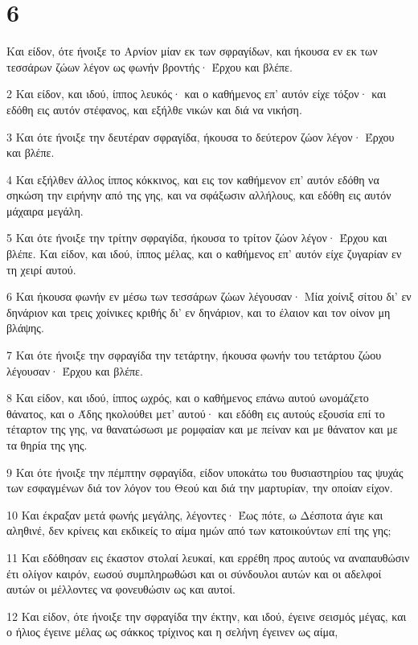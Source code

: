 \chapter{6}

\par Και είδον, ότε ήνοιξε το Αρνίον μίαν εκ των σφραγίδων, και ήκουσα εν εκ των τεσσάρων ζώων λέγον ως φωνήν βροντής· Έρχου και βλέπε.
\par 2 Και είδον, και ιδού, ίππος λευκός· και ο καθήμενος επ' αυτόν είχε τόξον· και εδόθη εις αυτόν στέφανος, και εξήλθε νικών και διά να νικήση.
\par 3 Και ότε ήνοιξε την δευτέραν σφραγίδα, ήκουσα το δεύτερον ζώον λέγον· Έρχου και βλέπε.
\par 4 Και εξήλθεν άλλος ίππος κόκκινος, και εις τον καθήμενον επ' αυτόν εδόθη να σηκώση την ειρήνην από της γης, και να σφάξωσιν αλλήλους, και εδόθη εις αυτόν μάχαιρα μεγάλη.
\par 5 Και ότε ήνοιξε την τρίτην σφραγίδα, ήκουσα το τρίτον ζώον λέγον· Έρχου και βλέπε. Και είδον, και ιδού, ίππος μέλας, και ο καθήμενος επ' αυτόν είχε ζυγαρίαν εν τη χειρί αυτού.
\par 6 Και ήκουσα φωνήν εν μέσω των τεσσάρων ζώων λέγουσαν· Μία χοίνιξ σίτου δι' εν δηνάριον και τρεις χοίνικες κριθής δι' εν δηνάριον, και το έλαιον και τον οίνον μη βλάψης.
\par 7 Και ότε ήνοιξε την σφραγίδα την τετάρτην, ήκουσα φωνήν του τετάρτου ζώου λέγουσαν· Έρχου και βλέπε.
\par 8 Και είδον, και ιδού, ίππος ωχρός, και ο καθήμενος επάνω αυτού ωνομάζετο θάνατος, και ο Άδης ηκολούθει μετ' αυτού· και εδόθη εις αυτούς εξουσία επί το τέταρτον της γης, να θανατώσωσι με ρομφαίαν και με πείναν και με θάνατον και με τα θηρία της γης.
\par 9 Και ότε ήνοιξε την πέμπτην σφραγίδα, είδον υποκάτω του θυσιαστηρίου τας ψυχάς των εσφαγμένων διά τον λόγον του Θεού και διά την μαρτυρίαν, την οποίαν είχον.
\par 10 Και έκραξαν μετά φωνής μεγάλης, λέγοντες· Έως πότε, ω Δέσποτα άγιε και αληθινέ, δεν κρίνεις και εκδικείς το αίμα ημών από των κατοικούντων επί της γης;
\par 11 Και εδόθησαν εις έκαστον στολαί λευκαί, και ερρέθη προς αυτούς να αναπαυθώσιν έτι ολίγον καιρόν, εωσού συμπληρωθώσι και οι σύνδουλοι αυτών και οι αδελφοί αυτών οι μέλλοντες να φονευθώσιν ως και αυτοί.
\par 12 Και είδον, ότε ήνοιξε την σφραγίδα την έκτην, και ιδού, έγεινε σεισμός μέγας, και ο ήλιος έγεινε μέλας ως σάκκος τρίχινος και η σελήνη έγεινεν ως αίμα,
